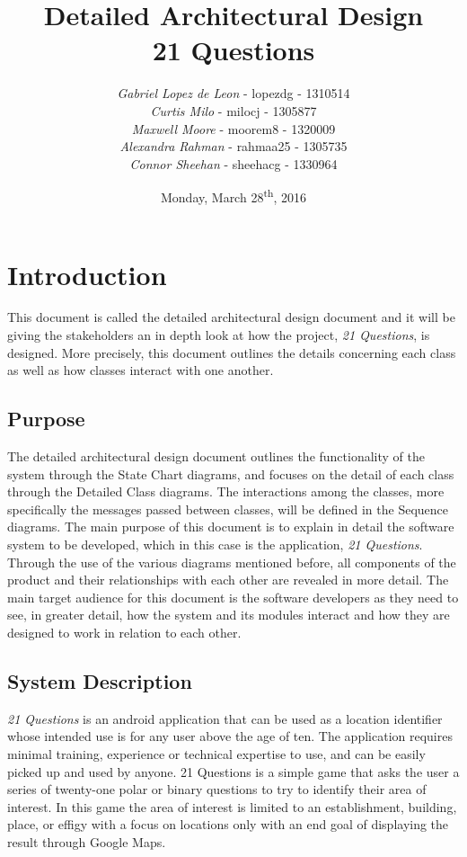 \documentclass[titlepage]{article}
\title{\Huge{\textbf{Detailed Architectural Design\\21 Questions}}\vspace{9cm}}
\author{\textit{Gabriel Lopez de Leon} - lopezdg - 1310514\\\textit{Curtis Milo} - milocj - 1305877\\\textit{Maxwell Moore} - moorem8 - 1320009\\\textit{Alexandra Rahman} - rahmaa25 - 1305735\\\textit{Connor Sheehan} - sheehacg - 1330964}
\date{Monday, March 28\textsuperscript{th}, 2016}
\begin{document}
\maketitle	

\section{Introduction}
\label{sec:introduction}

This document is called the detailed architectural design document and it will be giving the stakeholders an in depth look at how the project, \textit{21 Questions}, is designed. More precisely, this document outlines the details concerning each class as well as how classes interact with one another.

\subsection{Purpose}
\label{sub:purpose}


The detailed architectural design document outlines the functionality of the system through the State Chart diagrams, and focuses on the detail of each class through the Detailed Class diagrams. The interactions among the classes, more specifically the messages passed between classes, will be defined in the Sequence diagrams.  The main purpose of this document is to explain in detail the software system to be developed, which in this case is the application, \textit{21 Questions}. Through the use of the various diagrams mentioned before, all components of the product and their relationships with each other are revealed in more detail. The main target audience for this document is the software developers as they need to see, in greater detail, how the system and its modules interact and how they are designed to work in relation to each other.


\subsection{System Description}
\label{sub:system_description}


\textit{21 Questions} is an android application that can be used as a location identifier whose intended use is for any user above the age of ten. The application requires minimal training, experience or technical expertise to use, and can be easily picked up and used by anyone. 21 Questions is a simple game that asks the user a series of twenty-one polar or binary questions to try to identify their area of interest. In this game the area of interest is limited to an establishment, building, place, or effigy with a focus on locations only with an end goal of displaying the result through Google Maps.
\end{document}
